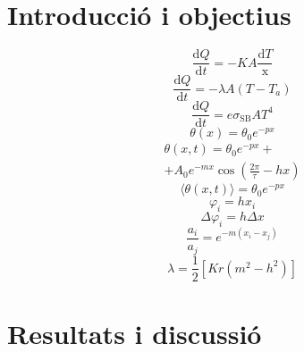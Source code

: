 \documentclass[12pt,twosides,onecolumn,openany]{article}
\begin{document}
\begin{multicols}{2}
\section{Introducció i objectius}
\begin{equation}\label{Fourier}
  \frac{\text{d}Q}{\text{d}t} = -KA \frac{\text{d}T}{\text{x}}
\end{equation}
\begin{equation}\label{Newton}
  \frac{\text{d}Q}{\text{d}t} = -\lambda A(T-T_a)
\end{equation}
\begin{equation}\label{Stefan-Boltzmann}
  \frac{\text{d}Q}{\text{d}t} = e\sigma_{\text{SB}}AT^{4}
\end{equation}
\begin{equation}\label{sol_estacionaria}
  \theta(x) = \theta_0e^{-px}
\end{equation}
\begin{multline}\label{sol_permanent}
  \theta(x,t) = \theta_0e^{-px} +\\
   + A_0e^{-mx}\cos{\left( \frac{2\pi}{\tau} -hx \right)} 
\end{multline}
\begin{equation}\label{prom_temp}
  \langle \theta(x,t) \rangle = \theta_0e^{-px}  
\end{equation}
\begin{equation}\label{desfasament}
  \varphi_i = hx_i
\end{equation}
\begin{equation}\label{increment_desfasament}
  \Delta \varphi_i = h\Delta x
\end{equation}
\begin{equation}\label{trobar_m}
  \frac{a_i}{a_j} = e^{-m(x_i-x_j)}
\end{equation}
\begin{equation}\label{valor_lambda}
  \lambda = \frac{1}{2}[Kr(m^2 - h^2)]
\end{equation}
\section{Resultats i discussió}

\end{multicols}
\end{document}
